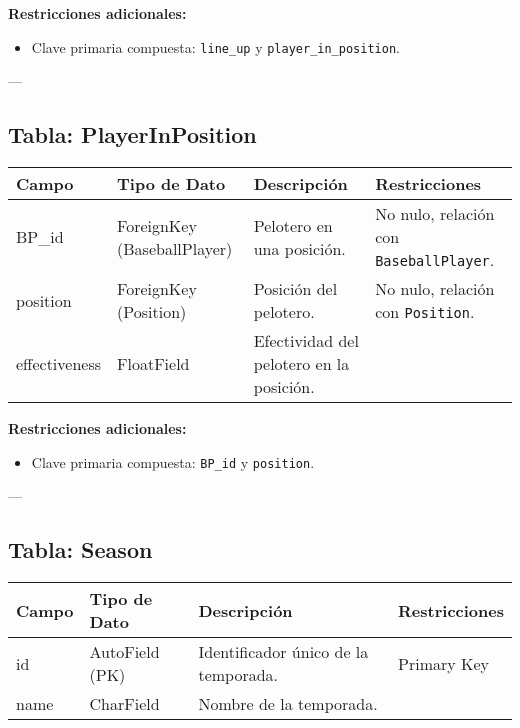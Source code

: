 \documentclass{report}
\begin{document}
    \textbf{Restricciones adicionales:}
    \begin{itemize}
        \item Clave primaria compuesta: \texttt{line\_up} y \texttt{player\_in\_position}.
    \end{itemize}
    
    ---
    
    \subsection*{Tabla: PlayerInPosition}
    \begin{tabular}{|>{\raggedright\arraybackslash}p{3cm}|>{\raggedright\arraybackslash}p{3cm}|>{\raggedright\arraybackslash}p{6cm}|>{\raggedright\arraybackslash}p{4cm}|}
        \hline
        \textbf{Campo} & \textbf{Tipo de Dato} & \textbf{Descripción} & \textbf{Restricciones} \\
        \hline
        BP\_id & ForeignKey (BaseballPlayer) & Pelotero en una posición. & No nulo, relación con \texttt{BaseballPlayer}. \\
        \hline
        position & ForeignKey (Position) & Posición del pelotero. & No nulo, relación con \texttt{Position}. \\
        \hline
        effectiveness & FloatField & Efectividad del pelotero en la posición. &  \\
        \hline
    \end{tabular}
    
    \textbf{Restricciones adicionales:}
    \begin{itemize}
        \item Clave primaria compuesta: \texttt{BP\_id} y \texttt{position}.
    \end{itemize}
    
    ---
    
    \subsection*{Tabla: Season}
    \begin{tabular}{|>{\raggedright\arraybackslash}p{3cm}|>{\raggedright\arraybackslash}p{3cm}|>{\raggedright\arraybackslash}p{6cm}|>{\raggedright\arraybackslash}p{4cm}|}
        \hline
        \textbf{Campo} & \textbf{Tipo de Dato} & \textbf{Descripción} & \textbf{Restricciones} \\
        \hline
        id & AutoField (PK) & Identificador único de la temporada. & Primary Key \\
        \hline
        name & CharField & Nombre de la temporada. &  \\
        \hline
    \end{tabular}
    
\end{document}
